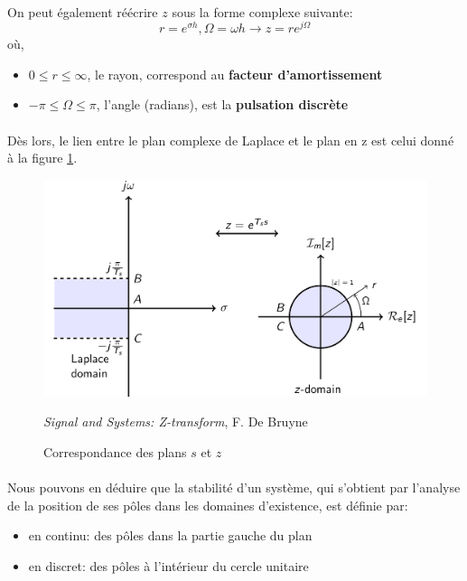 \paragraph{}
On peut également réécrire $z$ sous la forme complexe suivante:
\begin{equation}
r = e^{\sigma h}, 
\Omega = \omega h \rightarrow
z = re^{j\Omega}
\end{equation}
où,
\begin{itemize}[label=$\cdot$]
\item $0\leq r\leq \infty$, le rayon, correspond au \textbf{facteur d'amortissement}
\item $-\pi \leq \Omega \leq \pi$, l'angle (radians), est la \textbf{pulsation discrète}
\end{itemize}

\paragraph{}
Dès lors, le lien entre le plan complexe de Laplace et le plan en z est celui donné à la figure \ref{labo1-lien-plans}.
\begin{figure}[!h]
\center\includegraphics[scale=.2]{images/lien-plans}
\caption{Correspondance des plans $s$ et $z$}
  \small\textit{Signal and Systems: Z-transform}, F. De Bruyne
  \label{labo1-lien-plans}
\end{figure}
\paragraph{}
Nous pouvons en déduire que la stabilité d'un système, qui s'obtient par l'analyse de la position de ses pôles dans les domaines d'existence, est définie par:
\begin{itemize}[label=$\cdot$]
\item en continu: des pôles dans la partie gauche du plan
\item en discret: des pôles à l'intérieur du cercle unitaire
\end{itemize}

